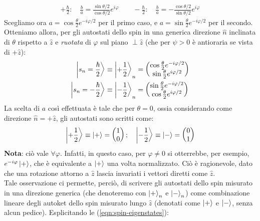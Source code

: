 \documentclass[../../FisicaTeorica.tex]{subfiles}
\begin{document}
\begin{align*}
+\frac{\hbar}{2}:\quad \frac{b}{a}=\frac{\sin\theta/2}{\cos\theta/2}e^{i\varphi}\qquad
-\frac{\hbar}{2}:\quad \frac{b}{a}=-\frac{\cos\theta/2}{\sin\theta/2} e^{i\varphi}
\end{align*}
Scegliamo ora $a = \cos\frac{\theta}{2}e^{-i\varphi/2}$ per il primo caso, e $a=\sin\frac{\theta}{2}e^{-i\varphi/2}$ per il secondo.
Otteniamo allora, per gli autostati dello spin in una generica direzione $\hat{n}$ inclinata di $\theta$ rispetto a $\hat{z}$ e \textit{ruotata} di $\varphi$ sul piano $\perp \hat{z}$ (che per $\psi>0$ è antioraria se vista  di $+\hat{z}$):
\begin{align}
\label{eqn:spin-eigenstates}
\Ket{s_n = \frac{\hbar}{2}} &\equiv \Ket{+\frac{1}{2}}_n = \begin{pmatrix}
\cos\frac{\theta}{2}e^{-i\varphi/2}\\
\sin\frac{\theta}{2} e^{i\varphi/2}
\end{pmatrix}\\ \nonumber
\Ket{s_n = -\frac{\hbar}{2}} &\equiv \Ket{-\frac{1}{2}}_n = \begin{pmatrix}
\sin\frac{\theta}{2} e^{-i\varphi/2}\\
\cos\frac{\theta}{2} e^{i\varphi/2}
\end{pmatrix}
\end{align}
La scelta di $a$ così effettuata è tale che per $\theta = 0$, ossia considerando come direzione $\hat{n} = +\hat{z}$, gli autostati sono scritti come:
\begin{align*}
    \Ket{+\frac{1}{2}} \equiv \Ket{+} = \begin{pmatrix}
    1\\0\end{pmatrix}; \quad \Ket{-\frac{1}{2}} \equiv \Ket{-} = \begin{pmatrix}0\\ 1
    \end{pmatrix}
\end{align*}
\textbf{Nota}: ciò vale $\forall \varphi$. Infatti, in questo caso, per $\varphi \neq 0$ si otterrebbe, per esempio, $e^{-i\varphi}\Ket{+}$, che è equivalente a $\Ket{+}$ una volta normalizzato. Ciò è ragionevole, dato che una rotazione attorno a $\hat{z}$ lascia invariati i vettori diretti come $\hat{z}$.\\
Tale osservazione ci permette, perciò, di scrivere gli autostati dello spin misurato in una direzione generica (che denoteremo con $\Ket{+}_n$ e $\Ket{-}_n$) come combinazione lineare degli autoket dello spin misurato lungo $\hat{z}$ (denotati come $\Ket{+}$ e $\Ket{-}$, senza alcun pedice). Esplicitando le (\ref{eqn:spin-eigenstates}):
\end{document}
